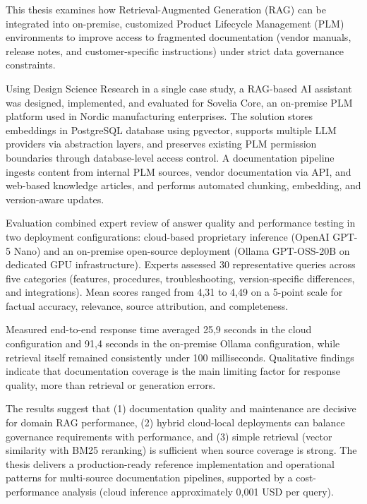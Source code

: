 This thesis examines how Retrieval-Augmented Generation (RAG) can be integrated into on-premise, customized Product Lifecycle Management (PLM) environments to improve access to fragmented documentation (vendor manuals, release notes, and customer-specific instructions) under strict data governance constraints.

Using Design Science Research in a single case study, a RAG-based AI assistant was designed, implemented, and evaluated for Sovelia Core, an on-premise PLM platform used in Nordic manufacturing enterprises. The solution stores embeddings in PostgreSQL database using pgvector, supports multiple LLM providers via abstraction layers, and preserves existing PLM permission boundaries through database-level access control. A documentation pipeline ingests content from internal PLM sources, vendor documentation via API, and web-based knowledge articles, and performs automated chunking, embedding, and version-aware updates.

Evaluation combined expert review of answer quality and performance testing in two deployment configurations: cloud-based proprietary inference (OpenAI GPT-5 Nano) and an on-premise open-source deployment (Ollama GPT-OSS-20B on dedicated GPU infrastructure). Experts assessed 30 representative queries across five categories (features, procedures, troubleshooting, version-specific differences, and integrations). Mean scores ranged from 4,31 to 4,49 on a 5-point scale for factual accuracy, relevance, source attribution, and completeness.

Measured end-to-end response time averaged 25,9 seconds in the cloud configuration and 91,4 seconds in the on-premise Ollama configuration, while retrieval itself remained consistently under 100 milliseconds. Qualitative findings indicate that documentation coverage is the main limiting factor for response quality, more than retrieval or generation errors.

The results suggest that (1) documentation quality and maintenance are decisive for domain RAG performance, (2) hybrid cloud-local deployments can balance governance requirements with performance, and (3) simple retrieval (vector similarity with BM25 reranking) is sufficient when source coverage is strong. The thesis delivers a production-ready reference implementation and operational patterns for multi-source documentation pipelines, supported by a cost-performance analysis (cloud inference approximately 0,001 USD per query).